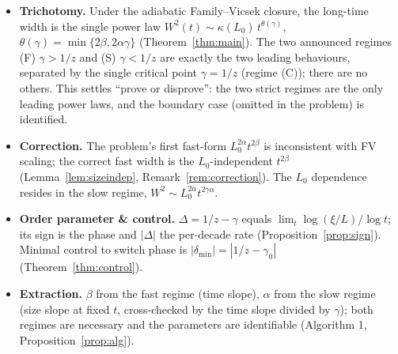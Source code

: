 \documentclass{amsart}
\theoremstyle{definition}
\newcommand{\asymp}{\sim}
\begin{document}
\begin{itemize}
\item \textbf{Trichotomy.} Under the adiabatic Family--Vicsek closure, the
  long-time width is the single power law $W^2(t)\asymp\kappa(L_0)\,t^{\theta(\gamma)}$,
  $\theta(\gamma)=\min\{2\beta,2\alpha\gamma\}$ (Theorem~\ref{thm:main}). The two
  announced regimes (F) $\gamma>1/z$ and (S) $\gamma<1/z$ are exactly the two
  leading behaviours, separated by the single critical point $\gamma=1/z$ (regime
  (C)); there are no others. This settles ``prove or disprove'': the two strict
  regimes are the only leading power laws, and the boundary case (omitted in the
  problem) is identified.
\item \textbf{Correction.} The problem's first fast-form $L_0^{2\alpha}t^{2\beta}$
  is inconsistent with FV scaling; the correct fast width is the $L_0$-independent
  $t^{2\beta}$ (Lemma~\ref{lem:sizeindep}, Remark~\ref{rem:correction}). The $L_0$
  dependence resides in the slow regime, $W^2\asymp L_0^{2\alpha}t^{2\gamma\alpha}$.
\item \textbf{Order parameter \& control.} $\Delta=1/z-\gamma$ equals
  $\lim_t\log(\xi/L)/\log t$; its sign is the phase and $|\Delta|$ the per-decade
  rate (Proposition~\ref{prop:sign}). Minimal control to switch phase is
  $|\delta_{\min}|=|1/z-\gamma_0|$ (Theorem~\ref{thm:control}).
\item \textbf{Extraction.} $\beta$ from the fast regime (time slope), $\alpha$ from
  the slow regime (size slope at fixed $t$, cross-checked by the time slope divided
  by $\gamma$); both regimes are necessary and the parameters are identifiable
  (Algorithm 1, Proposition~\ref{prop:alg}).
\end{itemize}
\end{document}
